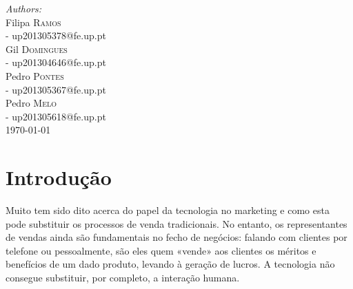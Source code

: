 \begin{titlepage}


\Large \emph{Authors:}\\[0.5cm] \normalsize
Filipa \textsc{Ramos}\\[0.1cm] 
- up201305378@fe.up.pt\\[0.1cm]  
Gil \textsc{Domingues}\\[0.1cm]  
- up201304646@fe.up.pt\\[0.1cm]
Pedro \textsc{Pontes}\\[0.1cm]
- up201305367@fe.up.pt\\[0.1cm] %
Pedro \textsc{Melo}\\[0.1cm]
- up201305618@fe.up.pt\\[2cm] %


{\large \today}\\[0cm] %


\tableofcontents


\section{Introdução} 

\justify\normalsize
Muito tem sido dito acerca do papel da tecnologia no marketing e como esta pode substituir os processos de venda tradicionais. No entanto, os representantes de vendas ainda são fundamentais no fecho de negócios: falando com clientes por telefone ou pessoalmente, são eles quem «vende» aos clientes os méritos e benefícios de um dado produto, levando à geração de lucros. A tecnologia não consegue substituir, por completo, a interação humana. 


\end{titlepage}
